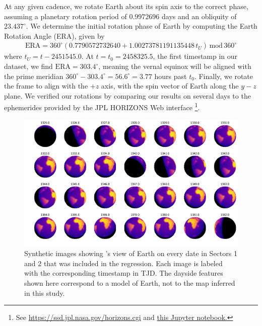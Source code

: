\documentclass[modern]{aastex62}
\begin{document}
At any given cadence, we rotate Earth about its spin axis to the correct phase,
assuming a planetary rotation period of $0.9972696$ days and an obliquity
of $23.437^\circ$. We determine the initial rotation
phase of Earth by computing the Earth Rotation Angle (ERA), given by \citep{Urban2013}
%
\begin{align}
\mathrm{ERA} = 360^\circ(0.7790572732640 + 1.00273781191135448 \, t_U) \, \mathrm{mod} \, 360^\circ
\end{align}
%
where $t_U = t - 2451545.0$. At $t = t_0 = 2458325.5$, the first timestamp in our dataset,
we find $\mathrm{ERA} = 303.4^\circ$, meaning the vernal equinox will be aligned with
the prime meridian $360^\circ - 303.4^\circ = 56.6^\circ = 3.77$ hours past $t_0$.
%
Finally, we rotate the frame to align
\TESS with the $+z$ axis, with the spin vector of Earth along the $y-z$ plane.
We verified our rotations by comparing our results on several days to the
ephemerides provided by the JPL HORIZONS Web interface%
\footnote{See \url{https://ssd.jpl.nasa.gov/horizons.cgi} and 
\href{https://github.com/rodluger/earthshine/blob/master/notebooks/SanityCheck.ipynb}{this
Jupyter notebook.}}.

\begin{figure}[t!]
    \begin{centering}
    \includegraphics[width=\linewidth]{figures/phases.pdf}
    \caption{\label{fig:phases}
             Synthetic images showing \TESS's view of Earth on every date in 
             Sectors 1 and 2 that was included in the regression. Each image 
             is labeled with the corresponding timestamp in TJD. 
             The dayside features shown here correspond to a 
             model of Earth, not to the map inferred in this study.
             }
    \end{centering}
\end{figure}
\end{document}
